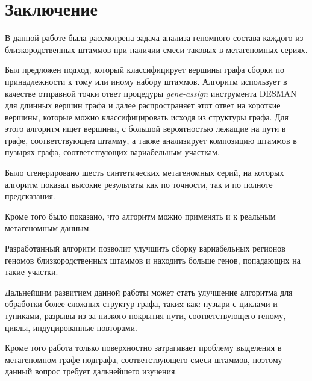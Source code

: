 \documentclass{spbau-diploma}
\begin{document}
\section*{Заключение}
В данной работе была рассмотрена задача анализа геномного состава каждого из близкородственных штаммов  при наличии смеси таковых в метагеномных сериях. 

Был предложен подход, который классифицирует вершины графа сборки по принадлежности к тому или иному набору штаммов. Алгоритм использует в качестве отправной точки ответ процедуры \textit{gene-assign} инструмента DESMAN для длинных вершин графа и далее распространяет этот ответ на короткие вершины, которые можно классифицировать исходя из структуры графа. Для этого алгоритм ищет вершины, с большой вероятностью лежащие на пути в графе, соответствующем штамму, а также анализирует композицию штаммов в пузырях графа, соответствующих вариабельным участкам.

Было сгенерировано шесть синтетических метагеномных серий, на которых алгоритм показал высокие результаты как по точности, так и по полноте предсказания.

Кроме того было показано, что алгоритм можно применять и к реальным метагеномным данным. 

Разработанный алгоритм позволит улучшить сборку вариабельных регионов геномов близкородственных штаммов и находить больше генов, попадающих на такие участки.

Дальнейшим развитием данной работы может стать улучшение алгоритма для обработки более сложных структур графа, такиx как: пузыри с циклами и тупиками, разрывы из-за низкого покрытия пути, соответствующего геному, циклы, индуцированные повторами.

Кроме того работа только поверхностно затрагивает проблему выделения в метагеномном графе подграфа, соответствующего смеси штаммов, поэтому данный вопрос требует дальнейшего изучения.




\end{document}
